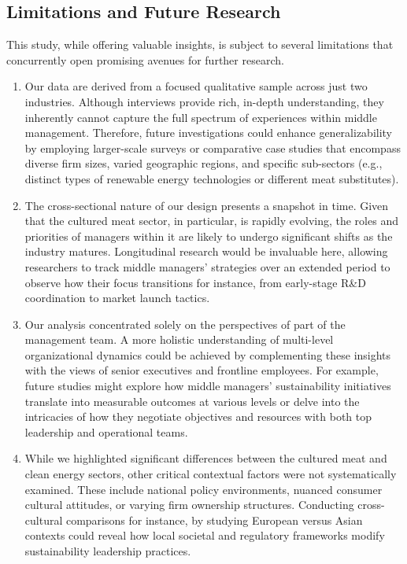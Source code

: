 	\subsection{Limitations and Future Research}
	This study, while offering valuable insights, is subject to several limitations that concurrently open promising avenues for further research.
	\begin{enumerate}
		\item Our data are derived from a focused qualitative sample across just two industries. Although interviews provide rich, in-depth understanding, they inherently cannot capture the full spectrum of experiences within middle management. Therefore, future investigations could enhance generalizability by employing larger-scale surveys or comparative case studies that encompass diverse firm sizes, varied geographic regions, and specific sub-sectors (e.g., distinct types of renewable energy technologies or different meat substitutes).
		
		\item The cross-sectional nature of our design presents a snapshot in time. Given that the cultured meat sector, in particular, is rapidly evolving, the roles and priorities of managers within it are likely to undergo significant shifts as the industry matures. Longitudinal research would be invaluable here, allowing researchers to track middle managers' strategies over an extended period to observe how their focus transitions for instance, from early-stage R\&D coordination to market launch tactics.
		
		\item Our analysis concentrated solely on the perspectives of part of the management team. A more holistic understanding of multi-level organizational dynamics could be achieved by complementing these insights with the views of senior executives and frontline employees. For example, future studies might explore how middle managers' sustainability initiatives translate into measurable outcomes at various levels or delve into the intricacies of how they negotiate objectives and resources with both top leadership and operational teams.
		
		\item While we highlighted significant differences between the cultured meat and clean energy sectors, other critical contextual factors were not systematically examined. These include national policy environments, nuanced consumer cultural attitudes, or varying firm ownership structures. Conducting cross-cultural comparisons for instance, by studying European versus Asian contexts could reveal how local societal and regulatory frameworks modify sustainability leadership practices.
	\end{enumerate}
	
